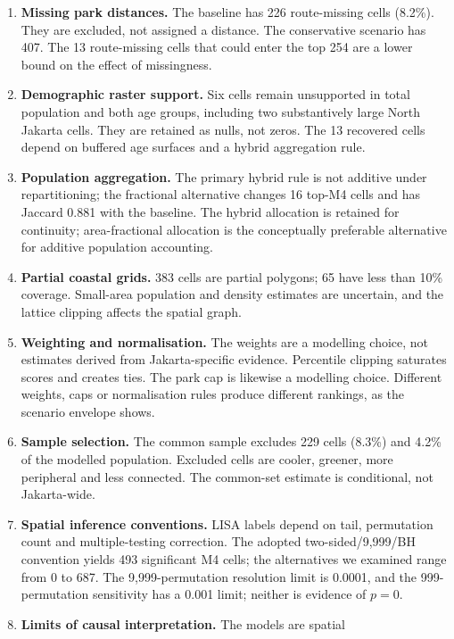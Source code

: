 \documentclass[times,twoside]{_Templates/MultiTargetManuscript}
\begin{document}
\begin{enumerate}
crossings, security gates, flooding or construction. Shortest-path distance is
not the same as walkability or perceived access.
\item \textbf{Missing park distances.} The baseline has 226 route-missing cells
(8.2\%). They are excluded, not assigned a distance. The conservative scenario
has 407. The 13 route-missing cells that could enter the top 254 are a lower
bound on the effect of missingness.
\item \textbf{Demographic raster support.} Six cells remain unsupported in total
population and both age groups, including two substantively large North Jakarta
cells. They are retained as nulls, not zeros. The 13 recovered cells depend on
buffered age surfaces and a hybrid aggregation rule.
\item \textbf{Population aggregation.} The primary hybrid rule is not additive
under repartitioning; the fractional alternative changes 16 top-M4 cells and has
Jaccard 0.881 with the baseline. The hybrid allocation is retained for
continuity; area-fractional allocation is the conceptually preferable
alternative for additive population accounting.
\item \textbf{Partial coastal grids.} 383 cells are partial polygons; 65 have
less than 10\% coverage. Small-area population and density estimates are
uncertain, and the lattice clipping affects the spatial graph.
\item \textbf{Weighting and normalisation.} The weights are a modelling choice,
not estimates derived from Jakarta-specific evidence. Percentile clipping
saturates scores and creates ties. The park cap is likewise a modelling choice.
Different weights, caps or normalisation rules produce different rankings, as
the scenario envelope shows.
\item \textbf{Sample selection.} The common sample excludes 229 cells (8.3\%)
and 4.2\% of the modelled population. Excluded cells are cooler, greener, more
peripheral and less connected. The common-set estimate is conditional, not
Jakarta-wide.
\item \textbf{Spatial inference conventions.} LISA labels depend on tail,
permutation count and multiple-testing correction. The adopted
two-sided/9,999/BH convention yields 493 significant M4 cells; the alternatives
we examined range from 0 to 687. The 9,999-permutation resolution limit is
0.0001, and the 999-permutation sensitivity has a 0.001 limit; neither is
evidence of $p=0$.
\item \textbf{Limits of causal interpretation.} The models are spatial

\end{enumerate}
\end{document}
